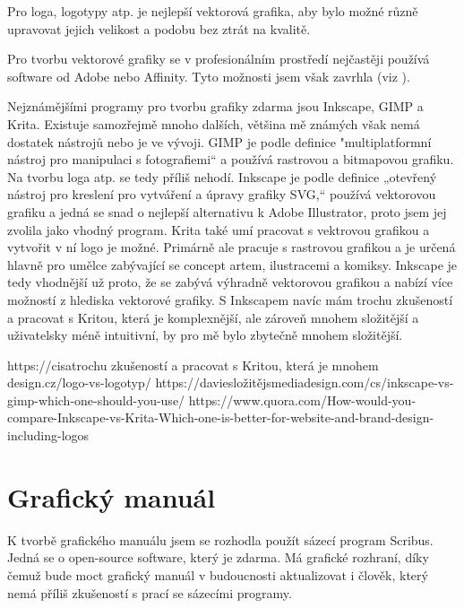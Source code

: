 \documentclass[11pt,a4paper,twoside,openright]{report}
\begin{document}

Pro loga, logotypy atp. je nejlepší vektorová grafika, aby bylo možné různě upravovat jejich velikost a podobu bez ztrát na kvalitě.

Pro tvorbu vektorové grafiky se v profesionálním prostředí nejčastěji používá software od Adobe nebo Affinity. Tyto možnosti jsem však zavrhla (viz ).

Nejznámějšími programy pro tvorbu grafiky zdarma jsou Inkscape, GIMP a Krita. Existuje samozřejmě mnoho dalších, většina mě známých však nemá dostatek nástrojů nebo je ve vývoji.
GIMP je podle definice "multiplatformní nástroj pro manipulaci s fotografiemi“ a používá rastrovou a bitmapovou grafiku. Na tvorbu loga atp. se tedy příliš nehodí.
Inkscape je podle definice „otevřený nástroj pro kreslení pro vytváření a úpravy grafiky SVG,“ používá vektorovou grafiku a jedná se snad o nejlepší alternativu k Adobe Illustrator, proto jsem jej zvolila jako vhodný program.
Krita také umí pracovat s vektrovou grafikou a vytvořit v ní logo je možné. Primárně ale pracuje s rastrovou grafikou a je určená hlavně pro umělce zabývající se concept artem, ilustracemi a komiksy. Inkscape je tedy vhodnější už proto, že se zabývá výhradně vektorovou grafikou a nabízí více možností z hlediska vektorové grafiky. S Inkscapem navíc mám trochu zkušeností a pracovat s Kritou, která je komplexnější, ale zároveň mnohem složitější a uživatelsky méně intuitivní, by pro mě bylo zbytečně mnohem složitější.


https://cisatrochu zkušeností a pracovat s Kritou, která je mnohem design.cz/logo-vs-logotyp/
https://daviesložitějsmediadesign.com/cs/inkscape-vs-gimp-which-one-should-you-use/
https://www.quora.com/How-would-you-compare-Inkscape-vs-Krita-Which-one-is-better-for-website-and-brand-design-including-logos

\section{Grafický manuál}
\label{sec:manual}
K tvorbě grafického manuálu jsem se rozhodla použít sázecí program Scribus. Jedná se o open-source software, který je zdarma. Má grafické rozhraní, díky čemuž bude moct grafický manuál v budoucnosti aktualizovat i člověk, který nemá příliš zkušeností s prací se sázecími programy.
\end{document}
